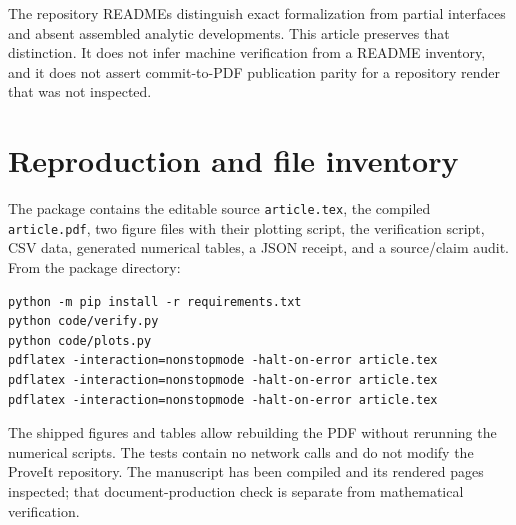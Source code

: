 \documentclass[11pt,a4paper]{article}
\numberwithin{equation}{section}
\theoremstyle{definition}\newtheorem{definition}[theorem]{Definition}
\theoremstyle{remark}\newtheorem{remark}[theorem]{Remark}
\begin{document}
The repository READMEs distinguish exact formalization from partial
interfaces and absent assembled analytic developments. This article
preserves that distinction. It does not infer machine verification from
a README inventory, and it does not assert commit-to-PDF publication
parity for a repository render that was not inspected.

\section{Reproduction and file inventory}
\label{app:reproduction}

The package contains the editable source \texttt{article.tex}, the compiled
\texttt{article.pdf}, two figure files with their plotting script, the
verification script, CSV data, generated numerical tables, a JSON receipt,
and a source/claim audit. From the package directory:
\begin{verbatim}
python -m pip install -r requirements.txt
python code/verify.py
python code/plots.py
pdflatex -interaction=nonstopmode -halt-on-error article.tex
pdflatex -interaction=nonstopmode -halt-on-error article.tex
pdflatex -interaction=nonstopmode -halt-on-error article.tex
\end{verbatim}
The shipped figures and tables allow rebuilding the PDF without rerunning
the numerical scripts. The tests contain no network calls and do not
modify the ProveIt repository. The manuscript has been compiled and its
rendered pages inspected; that document-production check is separate from
mathematical verification.
\end{document}
